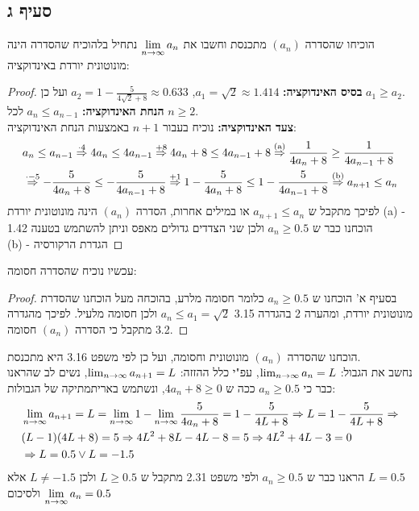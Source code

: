 \documentclass{article}
\begin{document}
	\subsection*{סעיף ג}
	הוכיחו שהסדרה $(a_n)$ מתכנסת וחשבו את $\displaystyle{\lim_{n \to \infty}{a_n}}$
	נתחיל בלהוכיח שהסדרה הינה מונוטונית יורדת באינדוקציה:
	\begin{proof} \nl
		\textbf{בסיס האינדוקציה:} $a_1 = \sqrt{2} \approx 1.414$, $a_2 = 1 - \frac{5}{4\sqrt{2} + 8} \approx 0.633$ ועל כן $a_1 \geq a_2$. \\
		\textbf{הנחת האינדוקציה:} $a_n \leq a_{n-1}$ לכל $n \geq 2$. \\
		\textbf{צעד האינדוקציה:} נוכיח בעבור $n+1$ באמצעות הנחת האינדוקציה:
		\begin{align*}
			&a_n \leq a_{n-1} \overset{\cdot 4}\Rightarrow
			4a_n \leq 4a_{n-1} \overset{+8}\Rightarrow
			4a_n + 8 \leq 4a_{n-1} + 8 \overset{\text{(a)}}\Rightarrow
			\frac{1}{4a_n+8} \geq \frac{1}{4a_{n-1}+8} \\
			&\overset{\cdot -5}\Rightarrow
			-\frac{5}{4a_n+8} \leq -\frac{5}{4a_{n-1}+8} \overset{+1}\Rightarrow
			1-\frac{5}{4a_n+8} \leq 1-\frac{5}{4a_{n-1}+8} \overset{\text{(b)}}\Rightarrow
			a_{n+1} \leq a_n
		\end{align*}
		לפיכך מתקבל ש $a_{n+1} \leq a_n$ או במילים אחרות, הסדרה $(a_n)$ הינה מונוטונית יורדת
		(a) - הוכחנו כבר ש $a_n \geq 0.5$ ולכן שני הצדדים גדולים מאפס וניתן להשתמש בטענה 1.42 \\
		(b) - הגדרת הרקורסיה
	\end{proof}
	עכשיו נוכיח שהסדרה חסומה:
	\begin{proof}
		בסעיף א' הוכחנו ש $a_n \geq 0.5$ כלומר חסומה מלרע,
		בהוכחה מעל הוכחנו שהסדרת מונוטונית יורדת, ומהערה 2 בהגדרה 3.15 $a_n \leq a_1 = \sqrt{2}$ ולכן חסומה מלעיל.
		לפיכך מהגדרה 3.2 מתקבל כי הסדרה $(a_n)$ חסומה.
	\end{proof} \nl
	הוכחנו שהסדרה $(a_n)$ מונוטונית וחסומה, ועל כן לפי משפט 3.16 היא מתכנסת. \\
	נחשב את הגבול: $\lim_{n \to \infty}{a_n} = L$, עפ"י כלל ההזזה: $\lim_{n \to \infty}{a_{n+1}} = L$,
	נשים לב שהראנו כבר כי $a_n \geq 0.5$ ככה ש $4a_n + 8 \geq 0$, ונשתמש באריתמתיקה של הגבולות:
	\begin{align*}
		&\lim_{n \to \infty} a_{n+1} = L = \lim_{n \to \infty}{1} - \lim_{n \to \infty}{\frac{5}{4a_n + 8}} = 1 - \frac{5}{4L + 8} \Rightarrow
		L = 1 - \frac{5}{4L + 8} \Rightarrow \\
		&(L - 1)(4L + 8) = 5 \Rightarrow
		4L^2 + 8L - 4L - 8 = 5 \Rightarrow
		4L^2 + 4L - 3 = 0 \\
		&\Rightarrow
		L = 0.5 \lor L = -1.5
	\end{align*}
	הראנו כבר ש $a_n \geq 0.5$ ולפי משפט 2.31 מתקבל ש $L \geq 0.5$ ולכן $L \neq -1.5$ אלא $L=0.5$ \\
	ולסיכום $\displaystyle{\lim_{n \to \infty}{a_n}} = 0.5$
\end{document}
